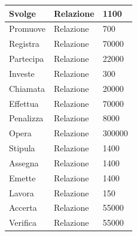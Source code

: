 \documentclass[11pt]{article}
\begin{document}
\begin{center}
\begin{tabular}{ |l|l|l| }
        \hline
        Svolge & Relazione & 1100 \\
        \hline
        Promuove & Relazione & 700 \\
        \hline
        Registra & Relazione & 70000 \\
        \hline
        Partecipa & Relazione & 22000 \\
        \hline
        Investe & Relazione & 300 \\
        \hline
        Chiamata & Relazione & 20000 \\
        \hline
        Effettua & Relazione & 70000 \\
        \hline
        Penalizza & Relazione & 8000 \\
        \hline
        Opera & Relazione & 300000 \\ %
        \hline
        Stipula & Relazione & 1400 \\
        \hline
        Assegna & Relazione & 1400 \\
        \hline
        Emette & Relazione & 1400 \\
        \hline
        Lavora & Relazione & 150 \\
        \hline
        Accerta & Relazione & 55000 \\
        \hline
        Verifica & Relazione & 55000 \\
        \hline
    \end{tabular}
\end{center}
\end{document}
